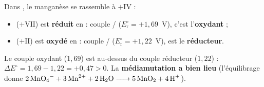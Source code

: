 \documentclass[11pt,a4paper]{article}
\begin{document}
\begin{corrige}
Dans , le manganèse se rassemble à $+\mathrm{IV}$ :
\begin{itemize}[leftmargin=1.5em,topsep=1pt,itemsep=1pt]
  \item {} ($+\mathrm{VII}$) est \textbf{réduit} en  : couple /
        ($E_{\mathrm{r}}^{\circ}=+1{,}69$~V), c'est l'\textbf{oxydant} ;
  \item {} ($+\mathrm{II}$) est \textbf{oxydé} en  : couple /
        ($E_{\mathrm{r}}^{\circ}=+1{,}22$~V),  est le \textbf{réducteur}.
\end{itemize}
Le couple oxydant ($1{,}69$) est au-dessus du couple réducteur ($1{,}22$) :
$\Delta E^{\circ}=1{,}69-1{,}22=+0{,}47>0$. La \textbf{médiamutation a bien lieu}
(l'équilibrage donne $\ce{2 MnO4^- + 3 Mn^{2+} + 2 H2O -> 5 MnO2 + 4 H+}$).
\end{corrige}
\end{document}
